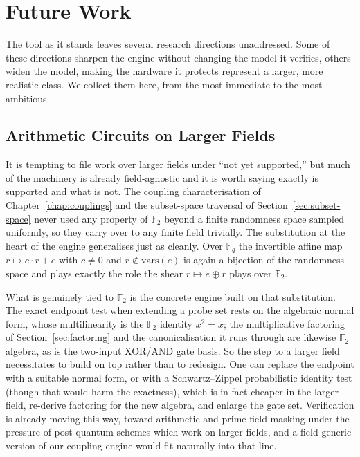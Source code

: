 \setlength{\parindent}{0pt}
\chapter{Future Work}
\label{chap:futurework}
The tool as it stands leaves several research directions unaddressed. Some of these directions
sharpen the engine
without changing the model it verifies, others widen the model, making the hardware
it protects represent a larger, more realistic class. We collect them here, from the most immediate to the most
ambitious.

\section{Arithmetic Circuits on Larger Fields}
\label{sec:fw-fields}

It is tempting to file work over larger fields under ``not yet supported,'' but
much of the machinery is already field-agnostic and it is worth saying exactly
is supported and what is not. The coupling characterisation of Chapter~\ref{chap:couplings} and the
subset-space traversal of Section~\ref{sec:subset-space} never used any property of
$\mathbb{F}_2$ beyond a finite randomness space sampled uniformly, so they carry
over to any finite field trivially. The substitution at the heart of the engine
generalises just as cleanly. Over $\mathbb{F}_q$ the invertible affine map
$r \mapsto c \cdot r + e$ with $c \neq 0$ and $r \notin \mathrm{vars}(e)$ is
again a bijection of the randomness space and plays exactly the role the shear
$r \mapsto e \oplus r$ plays over $\mathbb{F}_2$.

What is genuinely tied to $\mathbb{F}_2$ is the concrete engine built on that
substitution. The exact endpoint test when extending a probe set rests on the algebraic normal form, whose
multilinearity is the $\mathbb{F}_2$ identity $x^2 = x$; the multiplicative
factoring of Section~\ref{sec:factoring} and the canonicalisation it runs through
are likewise $\mathbb{F}_2$ algebra, as is the two-input XOR/AND gate basis. So the
step to a larger field necessitates to build on top rather than to redesign. One can replace
the endpoint with a suitable normal form, or with a Schwartz--Zippel probabilistic
identity test (though that would harm the exactness), which is in fact cheaper in the larger field,
re-derive factoring
for the new algebra, and enlarge the gate set. Verification is already moving this
way, toward arithmetic and prime-field masking under the pressure of post-quantum
schemes \parencite{gigerl2023formal} which work on larger fields, and a field-generic version of our coupling
engine would fit naturally into that line.

